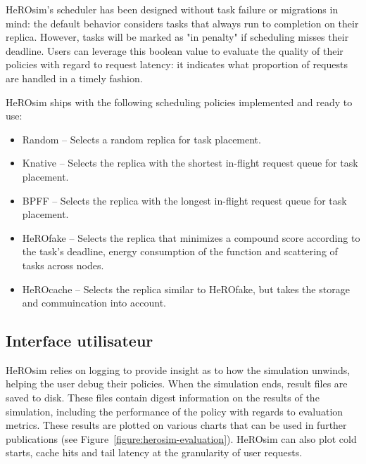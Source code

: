 HeROsim's scheduler has been designed without task failure or migrations in mind: the default behavior considers tasks that always run to completion on their replica. However, tasks will be marked as "in penalty" if scheduling misses their deadline. Users can leverage this boolean value to evaluate the quality of their policies with regard to request latency: it indicates what proportion of requests are handled in a timely fashion. 


HeROsim ships with the following scheduling policies implemented and ready to use:

\begin{itemize}
    \item Random -- Selects a random replica for task placement.
    \item Knative -- Selects the replica with the shortest in-flight request queue for task placement.
    \item BPFF -- Selects the replica with the longest in-flight request queue for task placement.
    \item HeROfake -- Selects the replica that minimizes a compound score according to the task's deadline, energy consumption of the function and scattering of tasks across nodes. %
    \item HeROcache -- Selects the replica similar to HeROfake, but takes the storage and commuincation into account. %
\end{itemize}


\subsection{Interface utilisateur}

HeROsim relies on logging to provide insight as to how the simulation unwinds, helping the user debug their policies. When the simulation ends, result files are saved to disk. These files contain digest information on the results of the simulation, including the performance of the policy with regards to evaluation metrics. These results are plotted on various charts that can be used in further publications (see Figure~\ref{figure:herosim-evaluation}). HeROsim can also plot cold starts, cache hits and tail latency at the granularity of user requests. %

